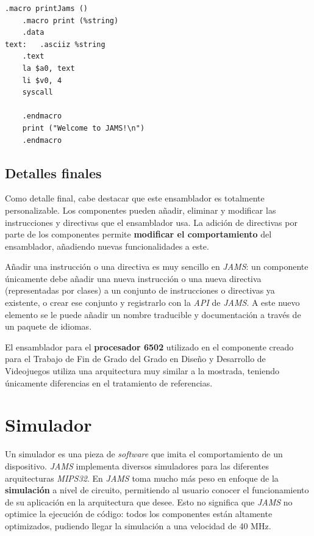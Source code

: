 \begin{lstlisting}[frame=single,label={lst:nested-macro}]
    .macro printJams ()
    .macro print (%string)
    .data
text:   .asciiz %string
    .text
    la $a0, text
    li $v0, 4
    syscall

    .endmacro
    print ("Welcome to JAMS!\n")
    .endmacro
\end{lstlisting}

\subsection{Detalles finales}\label{subsec:detalles-finales}

Como detalle final, cabe destacar que este ensamblador es totalmente personalizable.
Los componentes pueden añadir, eliminar y modificar las instrucciones y directivas
que el ensamblador usa.
La adición de directivas por parte de los componentes permite
\textbf{modificar el comportamiento} del ensamblador, añadiendo
nuevas funcionalidades a este.

Añadir una instrucción o una directiva es muy sencillo en \textit{JAMS}:
un componente únicamente debe añadir una nueva instrucción o
una nueva directiva (representadas por clases) a un conjunto de
instrucciones o directivas ya existente, o crear ese conjunto y registrarlo
con la \textit{API} de \textit{JAMS}.
A este nuevo elemento se le puede añadir un nombre traducible y documentación
a través de un paquete de idiomas.

El ensamblador para el \textbf{procesador 6502} utilizado en el
componente creado para el Trabajo de Fin de Grado del Grado en Diseño
y Desarrollo de Videojuegos utiliza una arquitectura muy similar a la mostrada,
teniendo únicamente diferencias en el tratamiento de referencias.

\section{Simulador}\label{sec:simulador}

Un simulador es una pieza de \textit{software} que imita el comportamiento
de un dispositivo.
\textit{JAMS} implementa diversos simuladores para las diferentes
arquitecturas \textit{MIPS32}.
En \textit{JAMS} toma mucho más peso en enfoque de la
\textbf{simulación} a nivel de circuito, permitiendo al usuario
conocer el funcionamiento de su aplicación en la arquitectura que desee.
Esto no significa que \textit{JAMS} no optimice la ejecución de código:
todos los componentes están altamente optimizados, pudiendo llegar
la simulación a una velocidad de 40 MHz.

